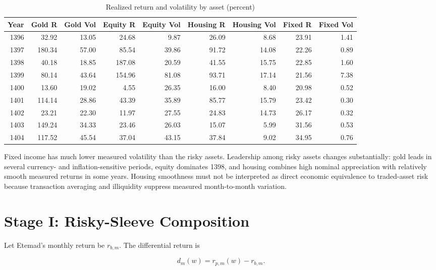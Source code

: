 \documentclass[11pt,a4paper]{article}
\begin{document}
\begin{landscape}
\begin{table}[p]
\centering
\small
\caption{Realized return and volatility by asset (percent)}
\label{tab:asset-results}
\begin{tabular}{rrrrrrrrr}
\toprule
Year & Gold R & Gold Vol & Equity R & Equity Vol & Housing R & Housing Vol & Fixed R & Fixed Vol \\
\midrule
1396 & 32.92 & 13.05 & 24.68 & 9.87 & 26.09 & 8.68 & 23.91 & 1.41 \\
1397 & 180.34 & 57.00 & 85.54 & 39.86 & 91.72 & 14.08 & 22.26 & 0.89 \\
1398 & 40.18 & 18.85 & 187.08 & 20.59 & 41.55 & 15.75 & 22.85 & 1.60 \\
1399 & 80.14 & 43.64 & 154.96 & 81.08 & 93.71 & 17.14 & 21.56 & 7.38 \\
1400 & 13.60 & 19.02 & 4.55 & 26.35 & 16.00 & 8.40 & 20.98 & 0.52 \\
1401 & 114.14 & 28.86 & 43.39 & 35.89 & 85.77 & 15.79 & 23.42 & 0.30 \\
1402 & 23.21 & 22.30 & 11.97 & 27.55 & 24.83 & 14.73 & 26.17 & 0.32 \\
1403 & 149.24 & 34.33 & 23.46 & 26.03 & 15.07 & 5.99 & 31.56 & 0.53 \\
1404 & 117.52 & 45.54 & 37.04 & 43.15 & 37.84 & 9.02 & 34.95 & 0.76 \\
\bottomrule
\end{tabular}
\end{table}
\end{landscape}

Fixed income has much lower measured volatility than the risky assets. Leadership among risky
assets changes substantially: gold leads in several currency- and inflation-sensitive periods,
equity dominates 1398, and housing combines high nominal appreciation with relatively smooth
measured returns in some years. Housing smoothness must not be interpreted as direct economic
equivalence to traded-asset risk because transaction averaging and illiquidity suppress measured
month-to-month variation.

\section{Stage I: Risky-Sleeve Composition}

Let Etemad's monthly return be $r_{b,m}$. The differential return is

\begin{equation}
d_m(w)=r_{p,m}(w)-r_{b,m}.
\end{equation}
\end{document}
